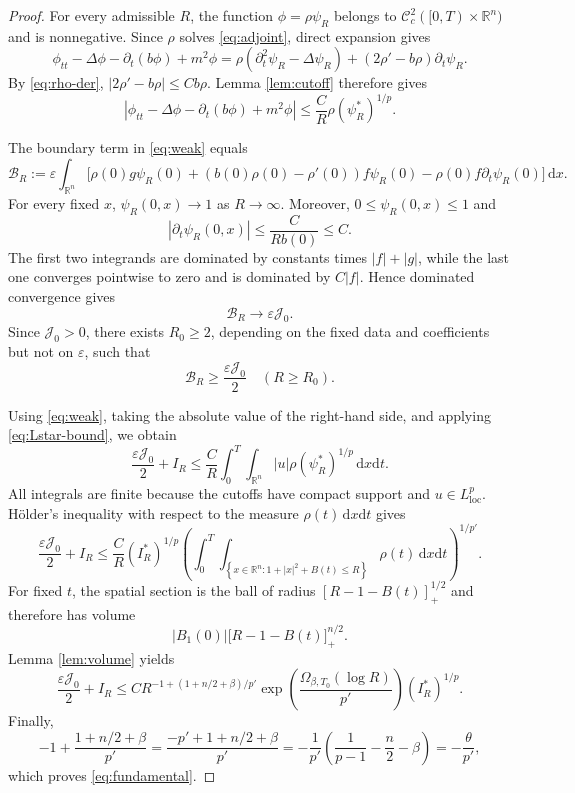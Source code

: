 \documentclass[11pt,reqno]{amsart}
\theoremstyle{definition}
\theoremstyle{remark}
\begin{document}
	\begin{proof}
		For every admissible $R$, the function $\phi=\rho\psi_R$ belongs to $\mathcal{C}_c^2([0,T)\times\mathbb R^n)$ and is nonnegative. Since $\rho$ solves \eqref{eq:adjoint}, direct expansion gives
		$$
		\phi_{tt}-\Delta\phi-\partial_t(b\phi)+m^2\phi
		=\rho(\partial_t^2\psi_R-\Delta\psi_R)
		+(2\rho'-b\rho)\partial_t\psi_R.
		$$
		By \eqref{eq:rho-der}, $|2\rho'-b\rho|\leq Cb\rho$. Lemma \ref{lem:cutoff} therefore gives
		\begin{equation}
			\label{eq:Lstar-bound}
			\left|
			\phi_{tt}-\Delta\phi-\partial_t(b\phi)+m^2\phi
			\right|
			\leq\frac{C}{R}\rho(\psi_R^*)^{1/p}.
		\end{equation}
		
		The boundary term in \eqref{eq:weak} equals
		$$
		\mathcal B_R:=\varepsilon\int_{\mathbb R^n}
		\bigl[\rho(0)g\psi_R(0)
		+(b(0)\rho(0)-\rho'(0))f\psi_R(0)-\rho(0)f\partial_t\psi_R(0)\bigr] \,\mathrm{d}x.
		$$
		For every fixed $x$, $\psi_R(0,x)\to1$ as $R\to\infty$. Moreover, $0\leq\psi_R(0,x)\leq1$ and
		$$
		|\partial_t\psi_R(0,x)|\leq\frac{C}{Rb(0)}\leq C.
		$$
		The first two integrands are dominated by constants times $|f|+|g|$, while the last one converges pointwise to zero and is dominated by $C|f|$. Hence dominated convergence gives
		$$
		\mathcal B_R\longrightarrow\varepsilon\mathcal J_0.
		$$
		Since $\mathcal J_0>0$, there exists $R_0\geq2$, depending on the fixed data and coefficients but not on $\varepsilon$, such that
		$$
		\mathcal B_R\geq\frac{\varepsilon\mathcal J_0}{2}
		\quad(R\geq R_0).
		$$
		
		Using \eqref{eq:weak}, taking the absolute value of the right-hand side, and applying \eqref{eq:Lstar-bound}, we obtain
		$$
		\frac{\varepsilon\mathcal J_0}{2}+I_R
		\leq\frac{C}{R}
		\int_0^T\int_{\mathbb{R}^n} |u|\rho(\psi_R^*)^{1/p}\,\mathrm{d}x\mathrm{d}t.
		$$
		All integrals are finite because the cutoffs have compact support and $u\in L^p_{\mathrm{loc}}$. H\"older's inequality with respect to the measure $\rho(t)\,\mathrm{d}x\mathrm{d}t$ gives
		$$
		\frac{\varepsilon\mathcal J_0}{2}+I_R \leq\frac{C}{R}(I_R^*)^{1/p}\left(\int_0^T
		\int_{\left\{x\in\mathbb{R}^n:
			1+|x|^2+B(t)\leq R\right\}}\rho(t)\,\mathrm{d}x\mathrm{d}t\right)^{1/p'}.
		$$
		For fixed $t$, the spatial section is the ball of radius $[R-1-B(t)]_+^{1/2}$ and therefore has volume
		$$
		|B_1(0)|\bigl[R-1-B(t)\bigr]_+^{n/2}.
		$$
		Lemma \ref{lem:volume} yields
		$$
		\frac{\varepsilon\mathcal J_0}{2}+I_R
		\leq CR^{-1+(1+n/2+\beta)/p'}
		\exp\left(\frac{\Omega_{\beta,T_0}(\log R)}{p'}\right)
		(I_R^*)^{1/p}.
		$$
		Finally,
		$$
		-1+\frac{1+n/2+\beta}{p'}
		=\frac{-p'+1+n/2+\beta}{p'}=-\frac{1}{p'}
		\left(\frac{1}{p-1}-\frac n2-\beta\right)
		=-\frac{\theta}{p'},
		$$
		which proves \eqref{eq:fundamental}.
	\end{proof}
	
\end{document}
